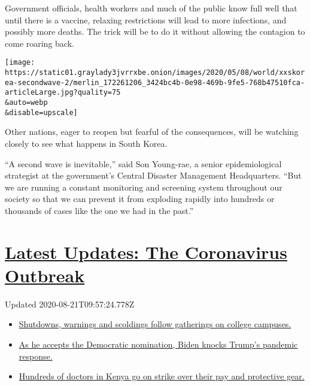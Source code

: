 Government officials, health workers and much of the public know full
well that until there is a vaccine, relaxing restrictions will lead to
more infections, and possibly more deaths. The trick will be to do it
without allowing the contagion to come roaring back.

\texttt{[image: https://static01.graylady3jvrrxbe.onion/images/2020/05/08/world/xxskorea-secondwave-2/merlin\_172261206\_3424bc4b-0e98-469b-9fe5-768b47510fca-articleLarge.jpg?quality=75\\\&auto=webp\\\&disable=upscale]}

Other nations, eager to reopen but fearful of the consequences, will be
watching closely to see what happens in South Korea.

``A second wave is inevitable,'' said Son Young-rae, a senior
epidemiological strategist at the government's Central Disaster
Management Headquarters. ``But we are running a constant monitoring and
screening system throughout our society so that we can prevent it from
exploding rapidly into hundreds or thousands of cases like the one we
had in the past.''

\hypertarget{latest-updates-the-coronavirus-outbreak}{%
\section{\texorpdfstring{\href{https://www.nytimes3xbfgragh.onion/2020/08/21/world/covid-19-coronavirus.html?action=click\&pgtype=Article\&state=default\&region=MAIN_CONTENT_1\&context=storylines_live_updates}{Latest
Updates: The Coronavirus
Outbreak}}{Latest Updates: The Coronavirus Outbreak}}\label{latest-updates-the-coronavirus-outbreak}}

Updated 2020-08-21T09:57:24.778Z

\begin{itemize}
\tightlist
\item
  \href{https://www.nytimes3xbfgragh.onion/2020/08/21/world/covid-19-coronavirus.html?action=click\&pgtype=Article\&state=default\&region=MAIN_CONTENT_1\&context=storylines_live_updates\#link-4690b6aa}{Shutdowns,
  warnings and scoldings follow gatherings on college campuses.}
\item
  \href{https://www.nytimes3xbfgragh.onion/2020/08/21/world/covid-19-coronavirus.html?action=click\&pgtype=Article\&state=default\&region=MAIN_CONTENT_1\&context=storylines_live_updates\#link-324af071}{As
  he accepts the Democratic nomination, Biden knocks Trump's pandemic
  response.}
\item
  \href{https://www.nytimes3xbfgragh.onion/2020/08/21/world/covid-19-coronavirus.html?action=click\&pgtype=Article\&state=default\&region=MAIN_CONTENT_1\&context=storylines_live_updates\#link-35890b73}{Hundreds
  of doctors in Kenya go on strike over their pay and protective gear.}
\end{itemize}


